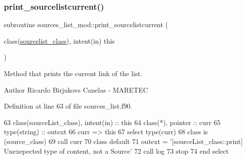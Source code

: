 \subsubsection{\texorpdfstring{print\+\_\+sourcelistcurrent()}{print\_sourcelistcurrent()}}
{\footnotesize\ttfamily subroutine sources\+\_\+list\+\_\+mod\+::print\+\_\+sourcelistcurrent (\begin{DoxyParamCaption}\item[{class(\mbox{\hyperlink{structsources__list__mod_1_1sourcelist__class}{sourcelist\+\_\+class}}), intent(in)}]{this }\end{DoxyParamCaption})\hspace{0.3cm}{\ttfamily [private]}}



Method that prints the current link of the list. 

\begin{DoxyAuthor}{Author}
Ricardo Birjukovs Canelas -\/ M\+A\+R\+E\+T\+EC 
\end{DoxyAuthor}


Definition at line 63 of file sources\+\_\+list.\+f90.


\begin{DoxyCode}
63     \textcolor{keywordtype}{class}(sourceList\_class), \textcolor{keywordtype}{intent(in)} :: this
64     \textcolor{keywordtype}{class}(*), \textcolor{keywordtype}{pointer} :: curr
65     \textcolor{keywordtype}{type}(string) :: outext
66     curr => this%
67     \textcolor{keywordflow}{select type}(curr)
68 \textcolor{keywordflow}{    class is} (source\_class)
69         \textcolor{keyword}{call }curr%
70 \textcolor{keywordflow}{        class default}
71         outext = \textcolor{stringliteral}{'[sourceList\_class::print] Unexepected type of content, not a Source'}
72         \textcolor{keyword}{call }log%
73         stop
74 \textcolor{keywordflow}{    end select}
\end{DoxyCode}
